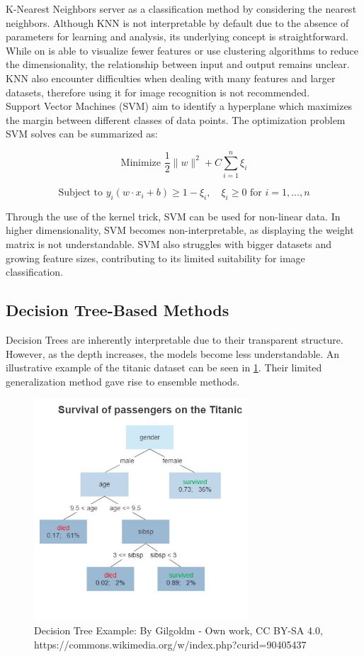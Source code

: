 K-Nearest Neighbors server as a classification method by considering the nearest neighbors. Although KNN is not interpretable by default due to the absence of parameters for learning and analysis, its underlying concept is straightforward. While on is able to visualize fewer features or use clustering algorithms to reduce the dimensionality, the relationship between input and output remains unclear. KNN also encounter difficulties when dealing with many features and larger datasets, therefore using it for image recognition is not recommended.
\\
Support Vector Machines (SVM) aim to identify a hyperplane which maximizes the margin between different classes of data points. The optimization problem SVM solves can be summarized as:

$$\text{Minimize } \frac{1}{2} \|w\|^2 + C \sum_{i=1}^{n} \xi_i$$

$$\text{Subject to } y_i (w \cdot x_i + b) \geq 1 - \xi_i, \quad \xi_i \geq 0 \text{ for } i = 1, \ldots, n$$

Through the use of the kernel trick, SVM can be used for non-linear data. In higher dimensionality, SVM becomes non-interpretable, as displaying the weight matrix is not understandable. SVM also struggles with bigger datasets and growing feature sizes, contributing to its limited suitability for image classification.


\subsection{Decision Tree-Based Methods}
\label{decision_tree}

Decision Trees are inherently interpretable due to their transparent structure. However, as the depth increases, the models become less understandable. An illustrative  example of the titanic dataset can be seen in \ref{fig:decision_tree}. Their limited generalization method gave rise to ensemble methods.

\begin{figure}[h!]
	\centering
	\includegraphics[width=80mm]{figs/Decision_Tree}
	\caption{Decision Tree Example: By Gilgoldm - Own work, CC BY-SA 4.0, https://commons.wikimedia.org/w/index.php?curid=90405437}
	\label{fig:decision_tree}
\end{figure}
 

